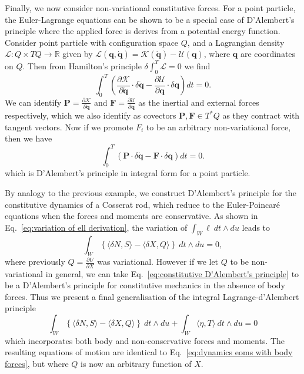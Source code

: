 Finally, we now consider non-variational constitutive forces. For a point particle, the Euler-Lagrange equations can be shown to be a special case of D'Alembert's principle where the applied force is derives from a potential energy function. Consider point particle with configuration space $Q$, and a Lagrangian density $\mathcal{L} : Q \times TQ \to \mathbb{R}$ given by $\mathcal{L}(\mathbf{q}, \dot{\mathbf{q}}) = \mathcal{K}(\dot{\mathbf{q}}) - \mathcal{U}(\mathbf{q})$, where $\mathbf{q}$ are coordinates on $Q$. Then from Hamilton's principle $\delta \int_0^T \mathcal{L} = 0$ we find
\begin{equation}
\int_0^T \left(  \frac{\partial \mathcal{K}}{\partial \dot{\mathbf{q}}} \cdot \delta \dot{\mathbf{q}}  - \frac{\partial \mathcal{U}}{\partial \mathbf{q}} \cdot \delta \mathbf{q} \right) dt = 0.
\end{equation}
We can identify $\mathbf{P} = \frac{\partial \mathcal{K}}{\partial \dot{\mathbf{q}}}$ and $\mathbf{F} = \frac{\partial \mathcal{U}}{\partial \mathbf{q}}$ as the inertial and external forces respectively, which we also identify as covectors $\mathbf{P}, \mathbf{F} \in T^*Q$ as they contract with tangent vectors. Now if we promote $F_i$ to be an arbitrary non-variational force, then we have
\begin{equation}
\int_0^T \left(  \mathbf{P} \cdot \delta \dot{\mathbf{q}}  - \mathbf{F} \cdot \delta \mathbf{q} \right) dt = 0.
\end{equation}
which is D'Alembert's principle in integral form for a point particle.

By analogy to the previous example, we construct D'Alembert's principle for the constitutive dynamics of a Cosserat rod, which reduce to the Euler-Poincaré equations when the forces and moments are conservative. As shown in Eq.~\ref{eq:variation of ell derivation}, the variation of $\int_W \ell\ dt \wedge du$ leads to
\begin{equation} \label{eq:constitutive D'Alembert's principle}
\int_W \left\{ \langle \delta N, S \rangle - \langle \delta X, Q \rangle \right\}\ dt \wedge du = 0,
\end{equation}
where previously $Q = \frac{\partial U}{\partial X}$ was variational. However if we let $Q$ to be non-variational in general, we can take Eq.~\ref{eq:constitutive D'Alembert's principle} to be a D'Alembert's principle for constitutive mechanics in the absence of body forces. Thus we present a final generalisation of the integral Lagrange-d'Alembert principle
\begin{equation} \label{eq:lagrange-dalembert for non-monogenic constitutive forces and body forces}
\int_W \left\{ \langle \delta N, S \rangle - \langle \delta X, Q \rangle \right\}\ dt \wedge du + \int_W \langle \eta, T \rangle \ dt \wedge du  = 0
\end{equation}
which incorporates both body and non-conservative forces and moments. The resulting equations of motion are identical to Eq.~\ref{eq:dynamics eoms with body forces}, but where $Q$ is now an arbitrary function of $X$.

